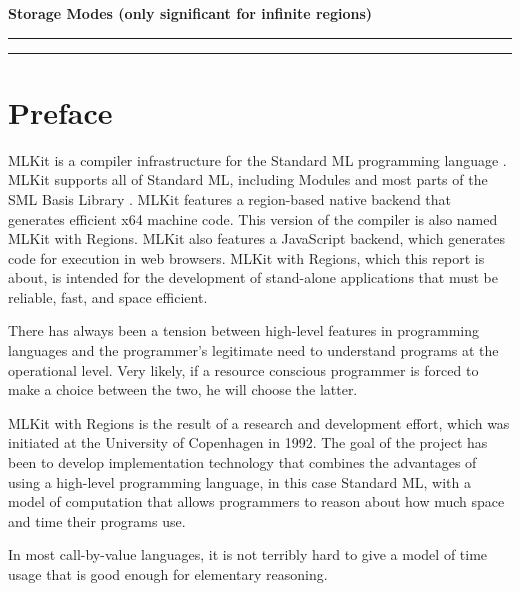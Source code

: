 \documentclass[12pt]{book}
\begin{document}
\begin{center}
\bf Storage Modes (only significant for infinite regions)
\end{center}
\smallskip

\hrule
{}
\hrule
\medskip

\tableofcontents
\chapter*{Preface}
MLKit is a compiler infrastructure for
%
%
%
the Standard ML programming language \cite{mthm97}. MLKit supports all of
Standard ML, including Modules and most parts of the SML Basis Library
\cite{basislib2004}.  MLKit features a region-based native backend that
generates efficient x64 machine code. This version of the compiler is also named
MLKit with Regions. MLKit also features a
%
%
%
JavaScript backend, which generates code for execution in web browsers. MLKit
with Regions, which this report is about, is intended for the development of
stand-alone applications that must be reliable, fast, and space efficient.

There has always been a tension between high-level features in programming
languages and the programmer's legitimate need to understand programs at the
operational level. Very likely, if a resource conscious programmer is forced to
make a choice between the two, he will choose the latter.

MLKit with Regions is the result of a research and development effort, which
was initiated at the University of Copenhagen in 1992.  The goal of the project
has been to develop implementation technology that combines the advantages of
using a high-level programming language, in this case Standard ML, with a model
of computation that allows programmers to reason about how much space and time
their programs use.

In most call-by-value languages, it is not terribly hard to give a model of time
usage that is good enough for elementary reasoning.
\end{document}
